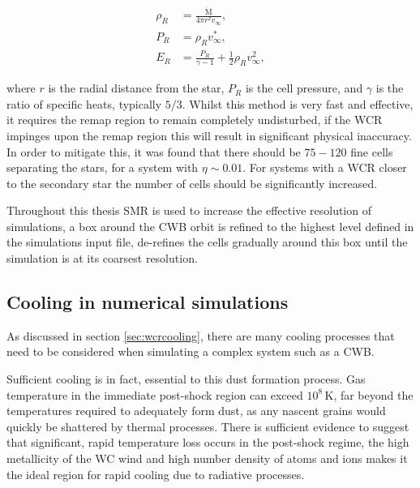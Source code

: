 \begin{subequations}
  \begin{align}
    \rho_R &= \frac{\dot{\text{M}}}{4 \pi r^2 v_\infty}, \\
    P_R    &= \rho_R v_\infty^*, \\
    E_R    &= \frac{P_R}{\gamma - 1} + \frac{1}{2} \rho_R v_\infty^2,
  \end{align}
\end{subequations}

\noindent
where $r$ is the radial distance from the star, $P_R$ is the cell pressure, and $\gamma$ is the ratio of specific heats, typically $5/3$.
Whilst this method is very fast and effective, it requires the remap region to remain completely undisturbed, if the WCR impinges upon the remap region this will result in significant physical inaccuracy.
In order to mitigate this, it was found that there should be $75-120$ fine cells separating the stars, for a system with $\eta\sim 0.01$.
For systems with a WCR closer to the secondary star the number of cells should be significantly increased.
 
Throughout this thesis SMR is used to increase the effective resolution of simulations, a box around the CWB orbit is refined to the highest level defined in the simulations input file, \athena{} de-refines the cells gradually around this box until the simulation is at its coarsest resolution.

\subsection{Cooling in numerical simulations}

As discussed in section \ref{sec:wcrcooling}, there are many cooling processes that need to be considered when simulating a complex system such as a CWB.

Sufficient cooling is in fact, essential to this dust formation process.
Gas temperature in the immediate post-shock region can exceed $10^8\, \si{\kelvin}$, far beyond the temperatures required to adequately form dust, as any nascent grains would quickly be shattered by thermal processes.
There is sufficient evidence to suggest that significant, rapid temperature loss occurs in the post-shock regime, the high metallicity of the WC wind and high number density of atoms and ions makes it the ideal region for rapid cooling due to radiative processes.

